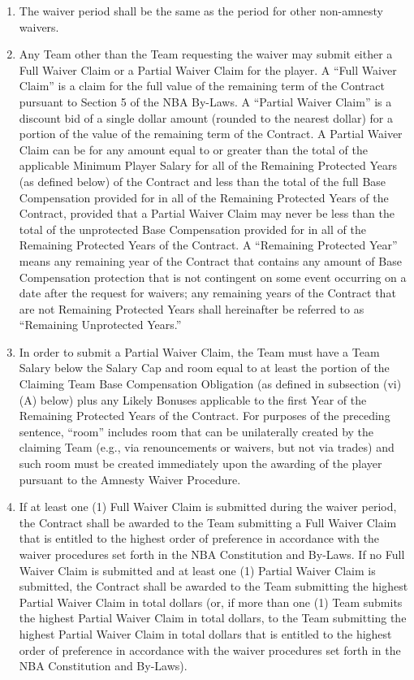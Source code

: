 \documentclass[
]{book}
\providecommand{\tightlist}{%
  \setlength{\itemsep}{0pt}\setlength{\parskip}{0pt}}
\begin{document}
\begin{enumerate}
\begin{enumerate}
    \begin{enumerate}
    \def\labelenumiii{(\roman{enumiii})}
    \tightlist
    \item
      The waiver period shall be the same as the period for other non-amnesty waivers.
    \item
      Any Team other than the Team requesting the waiver may submit either a Full Waiver Claim or a Partial Waiver Claim for the player. A ``Full Waiver Claim'' is a claim for the full value of the remaining term of the Contract pursuant to Section 5 of the NBA By-Laws. A ``Partial Waiver Claim'' is a discount bid of a single dollar amount (rounded to the nearest dollar) for a portion of the value of the remaining term of the Contract. A Partial Waiver Claim can be for any amount equal to or greater than the total of the applicable Minimum Player Salary for all of the Remaining Protected Years (as defined below) of the Contract and less than the total of the full Base Compensation provided for in all of the Remaining Protected Years of the Contract, provided that a Partial Waiver Claim may never be less than the total of the unprotected Base Compensation provided for in all of the Remaining Protected Years of the Contract. A ``Remaining Protected Year'' means any remaining year of the Contract that contains any amount of Base Compensation protection that is not contingent on some event occurring on a date after the request for waivers; any remaining years of the Contract that are not Remaining Protected Years shall hereinafter be referred to as ``Remaining Unprotected Years.''
    \item
      In order to submit a Partial Waiver Claim, the Team must have a Team Salary below the Salary Cap and room equal to at least the portion of the Claiming Team Base Compensation Obligation (as defined in subsection (vi)(A) below) plus any Likely Bonuses applicable to the first Year of the Remaining Protected Years of the Contract. For purposes of the preceding sentence, ``room'' includes room that can be unilaterally created by the claiming Team (e.g., via renouncements or waivers, but not via trades) and such room must be created immediately upon the awarding of the player pursuant to the Amnesty Waiver Procedure.
    \item
      If at least one (1) Full Waiver Claim is submitted during the waiver period, the Contract shall be awarded to the Team submitting a Full Waiver Claim that is entitled to the highest order of preference in accordance with the waiver procedures set forth in the NBA Constitution and By-Laws. If no Full Waiver Claim is submitted and at least one (1) Partial Waiver Claim is submitted, the Contract shall be awarded to the Team submitting the highest Partial Waiver Claim in total dollars (or, if more than one (1) Team submits the highest Partial Waiver Claim in total dollars, to the Team submitting the highest Partial Waiver Claim in total dollars that is entitled to the highest order of preference in accordance with the waiver procedures set forth in the NBA Constitution and By-Laws).

\end{enumerate}
\end{enumerate}
\end{enumerate}
\end{document}
